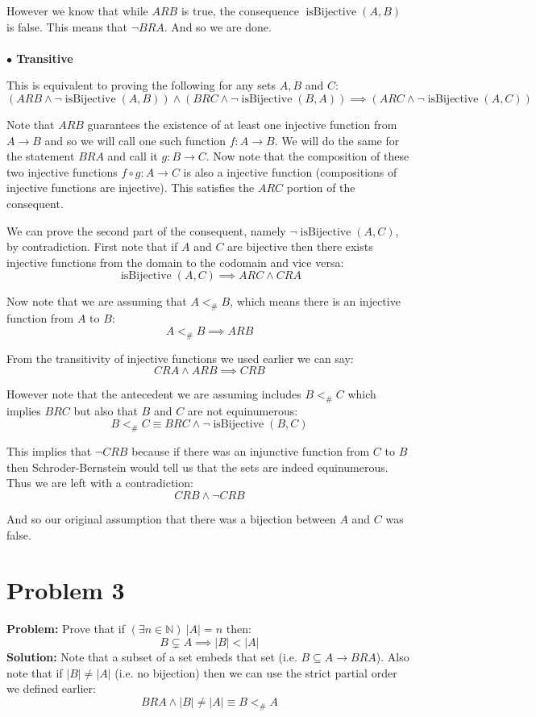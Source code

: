\documentclass{article}
\begin{document}
However we know that while $ARB$ is true, the consequence $\operatorname{isBijective}(A,B)$ is false. This means that $\neg BRA$. And so we are done.
\\\\
\textbf{$\bullet$ Transitive}

This is equivalent to proving the following for any sets $A,B$ and $C$:
$$(ARB\wedge\neg\operatorname{isBijective}(A,B))\wedge (BRC\wedge\neg\operatorname{isBijective}(B,A))\implies (ARC\wedge\neg\operatorname{isBijective}(A,C))$$

Note that $ARB$ guarantees the existence of at least one injective function from $A\to B$ and so we will call one such function $f:A\to B$. We will do the same for the statement $BRA$ and call it $g:B\to C$. Now note that the composition of these two injective functions $f\circ g:A\to C$ is also a injective function (compositions of injective functions are injective). This satisfies the $ARC$ portion of the consequent.

We can prove the second part of the consequent, namely $\neg\operatorname{isBijective}(A,C)$, by contradiction. First note that if $A$ and $C$ are bijective then there exists injective functions from the domain to the codomain and vice versa:
$$\operatorname{isBijective}(A,C)\implies ARC\wedge CRA$$

Now note that we are assuming that $A<_\#B$, which means there is an injective function from $A$ to $B$:
$$A<_\#B\implies ARB$$

From the transitivity of injective functions we used earlier we can say:
$$CRA\wedge ARB\implies CRB$$

However note that the antecedent we are assuming includes $B<_\#C$ which implies $BRC$ but also that $B$ and $C$ are not equinumerous:
$$B<_\#C\equiv BRC\wedge\neg \operatorname{isBijective}(B,C)$$

This implies that $\neg CRB$ because if there was an injunctive function from $C$ to $B$ then Schroder-Bernstein would tell us that the sets are indeed equinumerous. Thus we are left with a contradiction:
$$CRB\wedge \neg CRB$$

And so our original assumption that there was a bijection between $A$ and $C$ was false.

\section*{Problem 3}
\textbf{Problem:} Prove that if $(\exists n\in\mathbb N)\ |A|=n$ then:
$$B\subsetneq A\implies |B|<|A|$$
\textbf{Solution:} Note that a subset of a set embeds that set (i.e. $B\subseteq A\rightarrow BRA$). Also note that if $|B|\not=|A|$ (i.e. no bijection) then we can use the strict partial order we defined earlier:
$$BRA\wedge|B|\not=|A|\equiv B<_\# A$$
\end{document}

